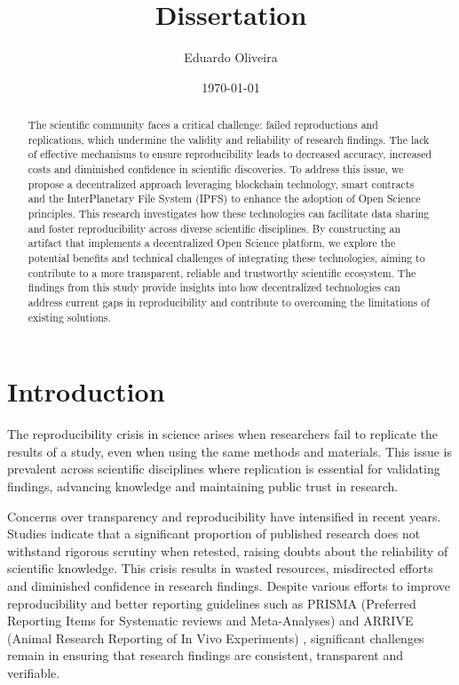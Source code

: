 \documentclass{article}
\title{Dissertation}
\author{Eduardo Oliveira}
\date{\today}
\begin{document}
\maketitle

\begin{abstract}
    The scientific community faces a critical challenge: failed reproductions and replications, which undermine the validity and reliability of research findings. The lack of effective mechanisms to ensure reproducibility leads to decreased accuracy, increased costs and diminished confidence in scientific discoveries. To address this issue, we propose a decentralized approach leveraging blockchain technology, smart contracts and the  InterPlanetary File System (IPFS) to enhance the adoption of Open Science principles. This research investigates how these technologies can facilitate data sharing and foster reproducibility across diverse scientific disciplines. By constructing an artifact that implements a decentralized Open Science platform, we explore the potential benefits and technical challenges of integrating these technologies, aiming to contribute to a more transparent, reliable and trustworthy scientific ecosystem. The findings from this study provide insights into how decentralized technologies can address current gaps in reproducibility and contribute to overcoming the limitations of existing solutions.
\end{abstract}


\section{Introduction}


The reproducibility crisis in science arises when researchers fail to replicate the results of a study, even when using the same methods and materials. This issue is prevalent across scientific disciplines where replication is essential for validating findings, advancing knowledge and maintaining public trust in research.

Concerns over transparency and reproducibility have intensified in recent years. Studies indicate that a significant proportion of published research does not withstand rigorous scrutiny when retested, raising doubts about the reliability of scientific knowledge. This crisis results in wasted resources, misdirected efforts and diminished confidence in research findings. Despite various efforts to improve reproducibility and better reporting guidelines such as PRISMA (Preferred Reporting Items for Systematic reviews and Meta-Analyses) \cite{Pagen71}and ARRIVE (Animal Research Reporting of In Vivo Experiments) \cite{percie2020arrive}, significant challenges remain in ensuring that research findings are consistent, transparent and verifiable.
\end{document}
